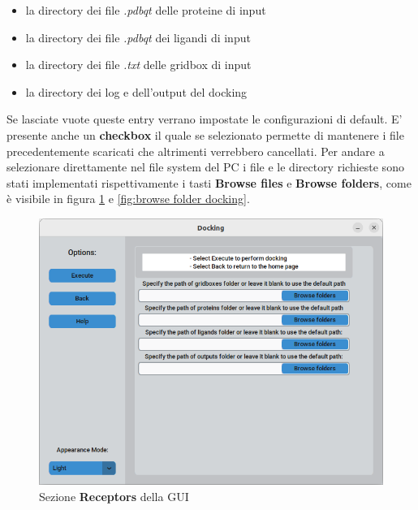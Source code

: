 \begin{itemize}
    \item la directory dei file \textit{.pdbqt} delle proteine di input
    \item la directory dei file \textit{.pdbqt} dei ligandi di input
    \item la directory dei file \textit{.txt} delle gridbox di input
    \item la directory dei log e dell'output del docking
\end{itemize}

Se lasciate vuote queste entry verrano impostate le configurazioni di default. E' presente anche un \textbf{checkbox} il quale se selezionato permette di mantenere i file precedentemente scaricati che altrimenti verrebbero cancellati.\newline
Per andare a selezionare direttamente nel file system del PC i file e le directory richieste sono stati implementati rispettivamente i tasti \textbf{Browse files} e \textbf{Browse folders}, come è visibile in figura \ref{fig:docking} e \ref{fig:browse folder docking}.

\begin{figure}[H]
    \centering
    \includegraphics[scale=0.6]{immagini/docking.png}
    \caption{Sezione \textbf{Receptors} della GUI}
    \label{fig:docking}
\end{figure}

